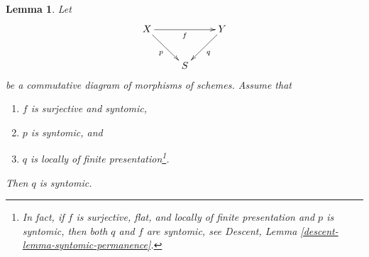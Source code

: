 \documentclass[10pt,a4paper]{amsart}
\theoremstyle{plain}
\newtheorem{lemma}[subsection]{Lemma}
\theoremstyle{definition}
\theoremstyle{remark}
\numberwithin{equation}{subsection}
\begin{document}
\begin{lemma}
\label{lemma-syntomic-permanence}
Let
$$
\xymatrix{
X \ar[rr]_f \ar[rd]_p & &
Y \ar[dl]^q \\
& S
}
$$
be a commutative diagram of morphisms of schemes. Assume that
\begin{enumerate}
\item $f$ is surjective and syntomic,
\item $p$ is syntomic, and
\item $q$ is locally of finite presentation\footnote{In fact, if $f$ is
surjective, flat, and locally of finite presentation and $p$ is syntomic,
then both $q$ and $f$ are syntomic, see
Descent, Lemma \ref{descent-lemma-syntomic-permanence}.}.
\end{enumerate}
Then $q$ is syntomic.
\end{lemma}
\end{document}
